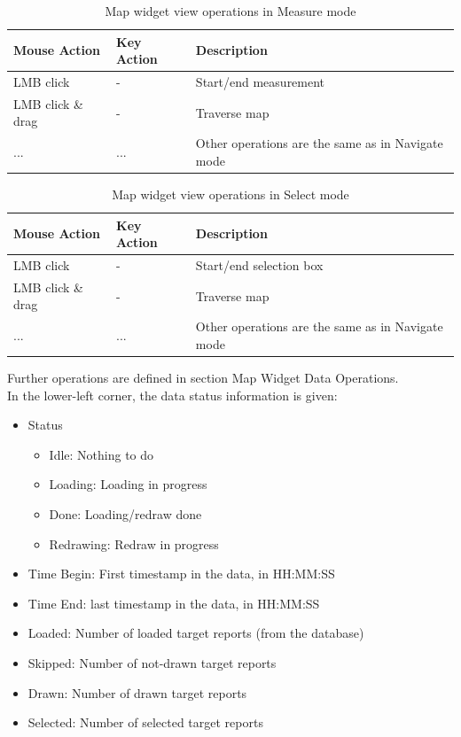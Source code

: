 \begin{table}[H]
  \center
  \begin{tabular}{ | l | l | l |}
    \hline
    \textbf{Mouse Action} & \textbf{Key Action} &  \textbf{Description} \\ \hline
    LMB click & - & Start/end measurement \\ \hline
    LMB click \& drag & - & Traverse map \\ \hline
    ... & ... & Other operations are the same as in Navigate mode \\ \hline  
    \end{tabular}
  \caption{Map widget view operations in Measure mode}
\end{table}

\begin{table}[H]
  \center
  \begin{tabular}{ | l | l | l |}
    \hline
    \textbf{Mouse Action} & \textbf{Key Action} &  \textbf{Description} \\ \hline
    LMB click & - & Start/end selection box \\ \hline
    LMB click \& drag & - & Traverse map \\ \hline
    ... & ... & Other operations are the same as in Navigate mode \\ \hline  
    \end{tabular}
  \caption{Map widget view operations in Select mode}
\end{table}

Further operations are defined in section Map Widget Data Operations. \\

In the lower-left corner, the data status information is given:

\begin{itemize}
 \item Status
\begin{itemize}
 \item Idle: Nothing to do
 \item Loading: Loading in progress
 \item Done: Loading/redraw done
 \item Redrawing: Redraw in progress
\end{itemize}
 \item Time Begin: First timestamp in the data, in HH:MM:SS
 \item Time End: last timestamp in the data, in HH:MM:SS
 \item Loaded: Number of loaded target reports (from the database)
 \item Skipped: Number of not-drawn target reports
 \item Drawn: Number of drawn target reports
 \item Selected: Number of selected target reports
\end{itemize}

